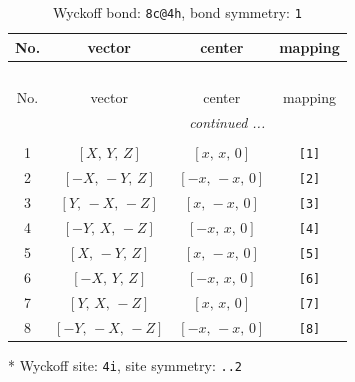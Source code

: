 \documentclass[fleqn,8pt]{jsarticle}
\begin{document}
\renewcommand{\arraystretch}{1.2}
\begin{longtable}{cccc}
\caption{Wyckoff bond: {\tt 8c@4h}, bond symmetry: {\tt 1}}
 \\
 \hline \hline
No. & vector & center & mapping \\ \hline \endfirsthead

\multicolumn{3}{l}{\tablename\ \thetable{}} \\
 \hline \hline
No. & vector & center & mapping \\ \hline \endhead

 \hline \hline
\multicolumn{3}{r}{\footnotesize\it continued ...} \\ \endfoot

 \hline \hline
\multicolumn{3}{r}{} \\ \endlastfoot

1 & $\left[ X,\, Y,\, Z \right]$ & $\left[ x,\, x,\, 0 \right]$ & {\tt [1]} \\ \hline
2 & $\left[ - X,\, - Y,\, Z \right]$ & $\left[ - x,\, - x,\, 0 \right]$ & {\tt [2]} \\ \hline
3 & $\left[ Y,\, - X,\, - Z \right]$ & $\left[ x,\, - x,\, 0 \right]$ & {\tt [3]} \\ \hline
4 & $\left[ - Y,\, X,\, - Z \right]$ & $\left[ - x,\, x,\, 0 \right]$ & {\tt [4]} \\ \hline
5 & $\left[ X,\, - Y,\, Z \right]$ & $\left[ x,\, - x,\, 0 \right]$ & {\tt [5]} \\ \hline
6 & $\left[ - X,\, Y,\, Z \right]$ & $\left[ - x,\, x,\, 0 \right]$ & {\tt [6]} \\ \hline
7 & $\left[ Y,\, X,\, - Z \right]$ & $\left[ x,\, x,\, 0 \right]$ & {\tt [7]} \\ \hline
8 & $\left[ - Y,\, - X,\, - Z \right]$ & $\left[ - x,\, - x,\, 0 \right]$ & {\tt [8]} \\
\end{longtable}
* Wyckoff site: {\tt 4i}, site symmetry: {\tt ..2}
\renewcommand{\arraystretch}{1.2}
\end{document}
